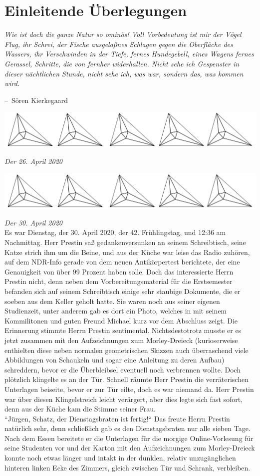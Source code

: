\documentclass[oneside]{memoir}
\makeatletter
\newcommand{\parasep}{
\bigskip
\bigskip
\begin{center} 
   \includegraphics[scale=.08]{parasep5.jpg} 
\end{center}
\bigskip
\bigskip
}
\newenvironment{chapquote}[2][2em]
  {\setlength{\@tempdima}{#1}%
   \def\chapquote@author{#2}%
   \parshape 1 \@tempdima \dimexpr\textwidth-2\@tempdima\relax%
   \itshape}
  {\par\normalfont\hfill--\ \chapquote@author\hspace*{\@tempdima}\par\bigskip}
\makeatother
\begin{document}
\chapter{Einleitende Überlegungen} %
\begin{chapquote}{Sören Kierkegaard}
\glqq Wie ist doch die ganze Natur so ominös! Voll Vorbedeutung ist mir der Vögel Flug, ihr Schrei, der Fische ausgelaßnes Schlagen gegen die Oberfläche des Wassers, ihr Verschwinden in der Tiefe, fernes Hundegebell, eines Wagens fernes Gerassel, Schritte, die von fernher widerhallen. Nicht sehe ich Gespenster in dieser nächtlichen Stunde, nicht sehe ich, was war, sondern das, was kommen wird.\grqq
\end{chapquote}

     
       \parasep
     \textit{Der 26. April 2020} \\ 
     
       \parasep
     \textit{Der 30. April 2020} \\
     
     Es war Dienstag, der 30. April 2020, der 42. Frühlingstag, und 12:36 am Nachmittag. Herr Prestin saß gedankenversunken an seinem Schreibtisch, seine Katze strich ihm um die Beine, und aus der Küche war leise das Radio zuhören, auf dem NDR-Info gerade von dem neuen Antikörpertest berichtete, der eine Genauigkeit von über 99 Prozent haben solle. Doch das interessierte Herrn Prestin nicht, denn neben dem Vorbereitungsmaterial für die Erstsemester befanden sich auf seinem Schreibtisch einige sehr staubige Dokumente, die er soeben aus dem Keller geholt hatte. Sie waren noch aus seiner eigenen Studienzeit, unter anderem gab es dort ein Photo, welches in mit seinem Kommilitonen und guten Freund Michael kurz vor dem Abschluss zeigt. Die Erinnerung stimmte Herrn Prestin sentimental. Nichtsdestotrotz musste er es jetzt zusammen mit den Aufzeichnungen zum Morley-Dreieck (kurioserweise enthielten diese neben normalen geometrischen Skizzen auch überraschend viele Abbildungen von Schaukeln und sogar eine Anleitung zu deren Aufbau) schreddern, bevor er die Überbleibsel eventuell noch verbrennen wollte. Doch plötzlich klingelte es an der Tür. Schnell räumte Herr Prestin die verräterischen Unterlagen beiseite, bevor er zur Tür eilte, doch es war niemand da. Herr Prestin war über diesen Klingelstreich leicht verärgert, aber dies legte sich fast sofort, denn aus der Küche kam die Stimme seiner Frau. \\
      “Jürgen, Schatz, der Dienstagsbraten ist fertig!“ Das freute Herrn Prestin natürlich sehr, denn schließlich gab es den Dienstagsbraten nur alle sieben Tage. Nach dem Essen bereitete er die Unterlagen für die morgige Online-Vorlesung für seine Studenten vor und der Karton mit den Aufzeichnungen zum Morley-Dreieck konnte noch etwas länger und intakt in der dunklen, relativ unzugänglichen hinteren linken Ecke des Zimmers, gleich zwischen Tür und Schrank, verbleiben. 
     
\end{document}
